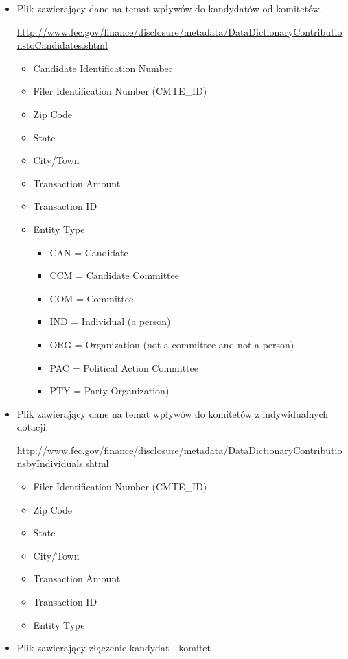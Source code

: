 \documentclass[10pt,a4paper]{article}
\begin{document}
\begin{itemize}
\item Plik zawierający dane na temat wpływów do kandydatów od komitetów.

\url{http://www.fec.gov/finance/disclosure/metadata/DataDictionaryContributionstoCandidates.shtml}

\begin{itemize}
\item Candidate Identification Number
\item Filer Identification Number (CMTE\_ID)
\item Zip Code
\item State
\item City/Town
\item Transaction Amount
\item Transaction ID
\item Entity Type
\begin{itemize}
\item CAN = Candidate
\item CCM = Candidate Committee
\item COM = Committee
\item IND = Individual (a person)
\item ORG = Organization (not a committee and not a person)
\item PAC = Political Action Committee
\item PTY = Party Organization)
\end{itemize}
\end{itemize}

\item Plik zawierający dane na temat wpływów do komitetów z indywidualnych dotacji.

\url{http://www.fec.gov/finance/disclosure/metadata/DataDictionaryContributionsbyIndividuals.shtml}

\begin{itemize}
\item Filer Identification Number (CMTE\_ID)
\item Zip Code
\item State
\item City/Town
\item Transaction Amount
\item Transaction ID
\item Entity Type 
\end{itemize}

\item Plik zawierający złączenie kandydat - komitet


\end{itemize}
\end{document}
